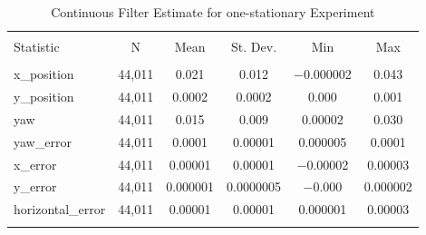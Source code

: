 
\begin{table}[h] \centering 
  \caption{Continuous Filter Estimate for one-stationary Experiment} 
  \label{tab:one_stationary_continuous_summary} 
\begin{tabular}{@{\extracolsep{5pt}}lccccc} 
\\[-1.8ex]\hline 
\hline \\[-1.8ex] 
Statistic & \multicolumn{1}{c}{N} & \multicolumn{1}{c}{Mean} & \multicolumn{1}{c}{St. Dev.} & \multicolumn{1}{c}{Min} & \multicolumn{1}{c}{Max} \\ 
\hline \\[-1.8ex] 
x\_position & 44,011 & 0.021 & 0.012 & $-$0.000002 & 0.043 \\ 
y\_position & 44,011 & 0.0002 & 0.0002 & 0.000 & 0.001 \\ 
yaw & 44,011 & 0.015 & 0.009 & 0.00002 & 0.030 \\ 
yaw\_error & 44,011 & 0.0001 & 0.00001 & 0.000005 & 0.0001 \\ 
x\_error & 44,011 & 0.00001 & 0.00001 & $-$0.00002 & 0.00003 \\ 
y\_error & 44,011 & 0.000001 & 0.0000005 & $-$0.000 & 0.000002 \\ 
horizontal\_error & 44,011 & 0.00001 & 0.00001 & 0.000001 & 0.00003 \\ 
\hline \\[-1.8ex] 
\end{tabular} 
\end{table} 
